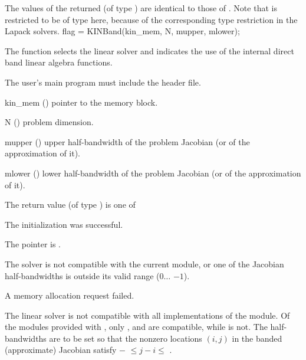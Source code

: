 {
  The values of the returned  (of type ) are identical
  to those of .
}
{
  Note that  is restricted to be of type  here, because
  of the corresponding type restriction in the Lapack solvers.
}
{
  flag = KINBand(kin\_mem, N, mupper, mlower);
}
{
  The function  selects the {\kinband} linear solver and indicates
  the use of the internal direct band linear algebra functions.

  The user's main program must include the  header file.
}
{
  \begin{args}
  \item[kin\_mem] ()
    pointer to the {\kinsol} memory block.
  \item[N] ()
    problem dimension.
  \item[mupper] ()
    upper half-bandwidth of the problem Jacobian (or of the approximation of it).
  \item[mlower] ()
    lower half-bandwidth of the problem Jacobian (or of the approximation of it).
  \end{args}
}
{
  The return value  (of type ) is one of
  \begin{args}
  \item[\Id{KINDLS\_SUCCESS}] 
    The {\kinband} initialization was successful.
  \item[\Id{KINDLS\_MEM\_NULL}]
    The  pointer is .
  \item[\Id{KINDLS\_ILL\_INPUT}]
    The {\kinband} solver is not compatible with the current {\nvector} module, or
    one of the Jacobian half-bandwidths is outside its valid range
    ($0 \ldots$ $-1$).
  \item[\Id{KINDLS\_MEM\_FAIL}]
    A memory allocation request failed.
  \end{args}
}
{
  The {\kinband} linear solver is not compatible with all
  implementations of the {\nvector} module.  Of the {\nvector} modules
  provided with {\sundials}, only {\nvecs}, {\nvecopenmp} and
  {\nvecpthreads} are compatible, while {\nvecp} is not.
  The half-bandwidths are to be set so that the nonzero locations $(i,j)$ in the
  banded (approximate) Jacobian satisfy $-$ $\leq j-i \leq$ .
}
